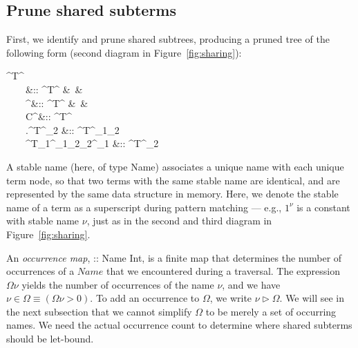 \subsection{Prune shared subterms}

First, we identify and prune shared subtrees, producing a pruned tree of the following form (second diagram in Figure~\ref{fig:sharing}):
%
\newcommand{\cT}{{^{\circ}\!T}}
\begin{haskell}
  \cT^\tau {} \\
  ~~~~\ell               &:: \cT^\tau
          &~& \\
  ~~~~\underline\nu^\tau  &:: \cT^\tau
          &~& \\
  ~~~~C^\tau              &:: \cT^\tau \\
  ~~~~\lambda\ell.\cT^{\tau_2} &:: \cT^{\tau_1\to\tau_2} \\
  ~~~~\cT_1^{\tau_1\to\tau_2}\app{}\cT_2^{\tau_1} &:: \cT^{\tau_2} \\
\end{haskell}
%

A stable name (here, of type \<Name\>) associates a unique name with each unique term node, so that two terms with the same stable name are identical, and are represented by the same data structure in memory. Here, we denote the stable name of a term as a superscript during pattern matching --- e.g., \(1^\nu\) is a constant with stable name $\nu$, just as in the second and third diagram in Figure~\ref{fig:sharing}.

An \emph{occurrence map}, \<\Omega :: Name \mapsto Int\>, is a finite map that determines the number of occurrences of a $\textit{Name}$ that we encountered during a traversal. The expression \(\Omega\nu\) yields the number of occurrences of the name $\nu$, and we have \mbox{\(\nu\in\Omega \equiv (\Omega\nu > 0)\)}. To add an occurrence to $\Omega$, we write \(\nu\rhd\Omega\). We will see in the next subsection that we cannot simplify $\Omega$ to be merely a set of occurring names. We need the actual occurrence count to determine where shared subterms should be let-bound.

